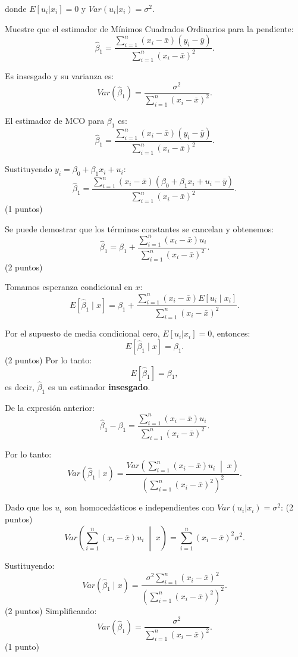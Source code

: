 \documentclass[10pt,a4paper]{article}
\begin{document}
\begin{enumerate}
donde $E[u_i|x_i]=0$ y $Var(u_i|x_i)=\sigma^2$.

Muestre que el estimador de Mínimos Cuadrados Ordinarios para la pendiente:
    \[
    \hat{\beta}_1 = \frac{\sum_{i=1}^n (x_i - \bar{x})(y_i - \bar{y})}{\sum_{i=1}^n (x_i - \bar{x})^2}.
    \]

Es insesgado y su varianza es:
    \[
    Var(\hat{\beta}_1) = \frac{\sigma^2}{\sum_{i=1}^n (x_i - \bar{x})^2}.
    \]



El estimador de MCO para $\beta_1$ es:
\[
\hat{\beta}_1 = \frac{\sum_{i=1}^n (x_i - \bar{x})(y_i - \bar{y})}{\sum_{i=1}^n (x_i - \bar{x})^2}.
\]

{\color{blue} Sustituyendo $y_i = \beta_0 + \beta_1 x_i + u_i$:
\[
\hat{\beta}_1 = \frac{\sum_{i=1}^n (x_i - \bar{x})(\beta_0 + \beta_1 x_i + u_i - \bar{y})}{\sum_{i=1}^n (x_i - \bar{x})^2}.
\]
(1 puntos)

Se puede demostrar que los términos constantes se cancelan y obtenemos:
\[
\hat{\beta}_1 = \beta_1 + \frac{\sum_{i=1}^n (x_i - \bar{x})u_i}{\sum_{i=1}^n (x_i - \bar{x})^2}.
\]
(2 puntos)

Tomamos esperanza condicional en $x$:
\[
E[\hat{\beta}_1 \mid x] = \beta_1 + 
\frac{\sum_{i=1}^n (x_i - \bar{x})E[u_i \mid x_i]}{\sum_{i=1}^n (x_i - \bar{x})^2}.
\]
 
Por el supuesto de media condicional cero, $E[u_i|x_i]=0$, entonces:
\[
E[\hat{\beta}_1 \mid x] = \beta_1.
\]
 (2 puntos)
Por lo tanto:
\[
E[\hat{\beta}_1] = \beta_1,
\]
es decir, $\hat{\beta}_1$ es un estimador \textbf{insesgado}.



De la expresión anterior:
\[
\hat{\beta}_1 - \beta_1 = \frac{\sum_{i=1}^n (x_i - \bar{x})u_i}{\sum_{i=1}^n (x_i - \bar{x})^2}.
\]

Por lo tanto:
\[
Var(\hat{\beta}_1 \mid x) = 
\frac{Var\left(\sum_{i=1}^n (x_i - \bar{x})u_i \;\middle|\; x \right)}{\left(\sum_{i=1}^n (x_i - \bar{x})^2\right)^2}.
\]

Dado que los $u_i$ son homocedásticos e independientes con $Var(u_i|x_i)=\sigma^2$: (2 puntos)
\[
Var\left(\sum_{i=1}^n (x_i - \bar{x})u_i \;\middle|\; x \right) 
= \sum_{i=1}^n (x_i - \bar{x})^2 \sigma^2.
\]

Sustituyendo:
\[
Var(\hat{\beta}_1 \mid x) = \frac{\sigma^2 \sum_{i=1}^n (x_i - \bar{x})^2}{\left(\sum_{i=1}^n (x_i - \bar{x})^2\right)^2}.
\]
(2 puntos)
Simplificando:
\[
Var(\hat{\beta}_1) = \frac{\sigma^2}{\sum_{i=1}^n (x_i - \bar{x})^2}.
\] (1 punto)
}




\end{enumerate}
\end{document}
